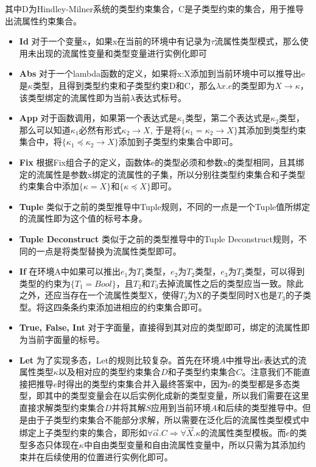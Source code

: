 \documentclass[12pt, titlepage]{article}
\begin{document}
	其中D为Hindley-Milner系统的类型约束集合，C是子类型约束的集合，用于推导出流属性约束集合。
	\begin{itemize}
	\item \textbf{Id} 对于一个变量x，如果x在当前的环境中有记录为$\tau$流属性类型模式，那么使用未出现的流属性变量和类型变量进行实例化即可
	\item \textbf{Abs} 对于一个lambda函数的定义，如果将x:X添加到当前环境中可以推导出e是$\kappa$类型，且得到类型约束和子类型约束D和C，那么$\lambda x.e$的类型即为$X\to\kappa$，该类型绑定的流属性即为当前$\lambda$表达式标号。  
	\item \textbf{App} 对于函数调用，如果第一个表达式是$\kappa_1$类型，第二个表达式是$\kappa_2$类型，那么可以知道$\kappa_1$必然有形式$\kappa_2 \to X$, 于是将$\{\kappa_1 =  \kappa_2\to X\}$其添加到类型约束集合中，将$\{\kappa_1\preceq\kappa_2\to X\}$添加到子类型约束集合中即可。
	\item \textbf{Fix} 根据Fix组合子的定义，函数体e的类型必须和参数x的类型相同，且其绑定的流属性是参数x绑定的流属性的子集，所以分别往类型约束集合和子类型约束集合中添加$\{\kappa= X\}$和$\{\kappa\preceq X\}$即可。
	\item \textbf{Tuple} 类似于之前的类型推导中Tuple规则，不同的一点是一个Tuple值所绑定的流属性即为这个值的标号本身。
	\item \textbf{Tuple Deconstruct} 类似于之前的类型推导中的Tuple Deconstruct规则，不同的一点是将类型替换为流属性类型即可。
	\item \textbf{If} 在环境A中如果可以推出$e_1$为$T_1$类型，$e_2$为$T_2$类型，$e_3$为$T_3$类型，可以得到类型的约束为$\{T_1 = Bool\}$，且$T_2$和$T_3$去掉流属性之后的类型应当一致。除此之外，还应当存在一个流属性类型X，使得$T_2$为X的子类型同时X也是$T_3$的子类型。将这四条条约束添加进相应的约束集合即可。
	\item \textbf{True, False, Int} 对于字面量，直接得到其对应的类型即可，绑定的流属性即为当前字面量的标号。
	\item \textbf{Let} 为了实现多态，Let的规则比较复杂。首先在环境$A$中推导出$e$表达式的流属性类型$\kappa$以及相对应的类型约束集合$D$和子类型约束集合$C$。注意我们不能直接把推导$e$时得出的类型约束集合并入最终答案中，因为$e$的类型都是多态类型，即其中的类型变量会在以后实例化成新的类型变量，所以我们需要在这里直接求解类型约束集合$D$并将其解$S$应用到当前环境$A$和后续的类型推导中。但是由于子类型约束集合不能部分求解，所以需要在泛化后的流属性类型模式中绑定上子类型约束的集合，即形如$\forall\vec{\alpha}.C\Rightarrow\forall\vec{X}.\kappa$的流属性类型模板。而$e$的类型多态只体现在$\kappa$中自由类型变量和自由流属性变量中，所以只需为其添加约束并在后续使用的位置进行实例化即可。
	\end{itemize}
	
\end{document}
